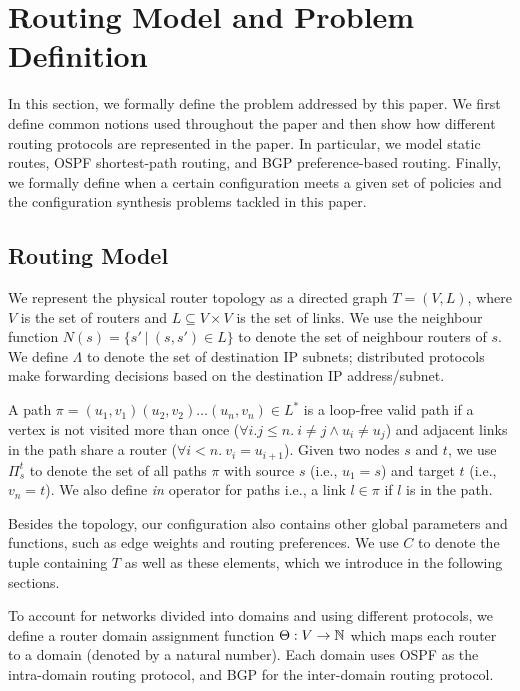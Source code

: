 \section{Routing Model and Problem Definition}

In this section, we formally define the problem addressed by this paper.
We first define common notions used throughout the paper and 
then show how different routing protocols are represented in the paper.
In particular, we model static routes, OSPF shortest-path routing, and BGP preference-based
routing.
Finally, we formally define when a certain configuration meets a given set of policies
and the configuration synthesis problems tackled in this paper.

\subsection{Routing Model}

We represent the physical router topology as a directed graph $T=(V, L)$,
where $V$ is the set of routers and $L\subseteq V\times V$ is the set of links. 
We use the neighbour function $N(s) = \{s'\ | \ (s,s') \in L \}$ to denote 
the set of neighbour routers of $s$. 
We define $\Lambda$ to denote the set of destination IP subnets;
distributed protocols make forwarding decisions based on the 
destination IP address/subnet.

A path $\pi = (u_1,v_1) (u_2, v_2) \ldots (u_n, v_n) \in L^*$ is a loop-free valid path if
a  vertex is not visited more than once ($\forall i.j \leq n. 
~i \not= j \wedge u_i \not= u_j$) and adjacent links in the
path share a router ($\forall i < n. ~v_i = u_{i+1}$).
Given two nodes $s$ and $t$, we use $\Pi_s^t$ to denote the set of all paths
$\pi$ with source $s$ (i.e., $u_1=s$) and target $t$ (i.e., $v_n=t$). 
We also define \emph{in} operator for paths i.e., a link $l \in
\pi$ if $l$ is in the path. 

Besides the topology, our configuration also contains other global parameters and functions, such as edge
weights and routing preferences. 
We use $C$ to denote the tuple containing $T$ as well as these elements, which we introduce in the following sections.



To account for networks divided into domains and using different protocols,
we define a router domain assignment function
$\Theta: V \rightarrow \mathbb{N}$ which maps each router to a domain 
(denoted by a natural number). Each domain uses OSPF as the 
intra-domain routing protocol, and BGP for the inter-domain routing
protocol. 

